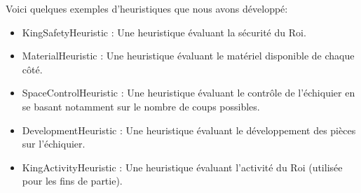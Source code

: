\documentclass{article}
\begin{document}
Voici quelques exemples d'heuristiques que nous avons développé:
\begin{itemize}
    \item KingSafetyHeuristic : Une heuristique évaluant la sécurité du Roi.
    \item MaterialHeuristic : Une heuristique évaluant le matériel disponible de chaque côté.
    \item SpaceControlHeuristic : Une heuristique évaluant le contrôle de l'échiquier en se basant notamment sur le nombre
    de coups possibles.
    \item DevelopmentHeuristic : Une heuristique évaluant le développement des pièces sur l'échiquier.
    \item KingActivityHeuristic : Une heuristique évaluant l'activité du Roi (utilisée pour les fins de partie).
\end{itemize}
\end{document}
